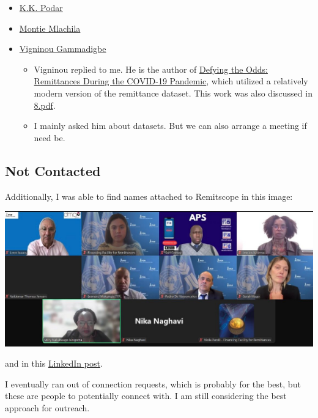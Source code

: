 \documentclass[
  11pt,
]{article}
\providecommand{\tightlist}{%
  \setlength{\itemsep}{0pt}\setlength{\parskip}{0pt}}\usepackage{longtable,booktabs,array}
\begin{document}
\begin{itemize}
\tightlist
\item
  \href{https://www.linkedin.com/in/kkpodar/}{K.K. Podar}
\item
  \href{https://www.linkedin.com/in/montie-mlachila-3353928/}{Montie
  Mlachila}
\item
  \href{https://www.linkedin.com/in/vigninou-gammadigbe-49ab9543/?originalSubdomain=sn}{Vigninou
  Gammadigbe}

  \begin{itemize}
  \tightlist
  \item
    Vigninou replied to me. He is the author of
    \href{https://www.imf.org/en/Publications/WP/Issues/2021/07/16/Defying-the-Odds-Remittances-During-the-COVID-19-Pandemic-461321}{Defying
    the Odds: Remittances During the COVID-19 Pandemic}, which utilized
    a relatively modern version of the remittance dataset. This work was
    also discussed in
    \href{https://github.com/WilliamClintC/RER/blob/main/_output/8.pdf}{8.pdf}.
  \item
    I mainly asked him about datasets. But we can also arrange a meeting
    if need be.
  \end{itemize}
\end{itemize}

\subsection{Not Contacted}\label{not-contacted}

Additionally, I was able to find names attached to Remitscope in this
image:

\includegraphics{images/1743167000666.jpg}

and in this
\href{https://www.linkedin.com/posts/financing-facility-for-remittances-ffr_remittance-activity-7311372331552014336-y1XR/}{LinkedIn
post}.

I eventually ran out of connection requests, which is probably for the
best, but these are people to potentially connect with. I am still
considering the best approach for outreach.
\end{document}

